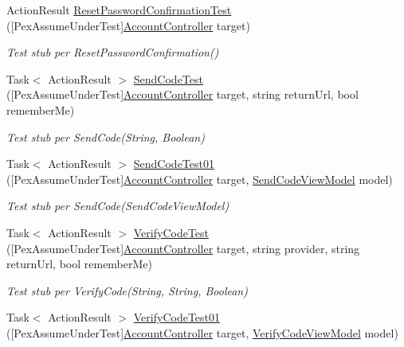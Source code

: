 \begin{DoxyCompactItemize}
Action\+Result \mbox{\hyperlink{class_brew_day2_1_1_tests_1_1_account_controller_test_a7a031ab5085a878292c47235638abee4}{Reset\+Password\+Confirmation\+Test}} (\mbox{[}Pex\+Assume\+Under\+Test\mbox{]}\mbox{\hyperlink{class_brew_day2_1_1_controllers_1_1_account_controller}{Account\+Controller}} target)
\begin{DoxyCompactList}\small\item\em Test stub per Reset\+Password\+Confirmation()\end{DoxyCompactList}\item 
Task$<$ Action\+Result $>$ \mbox{\hyperlink{class_brew_day2_1_1_tests_1_1_account_controller_test_ae3f845b68eb068d8dbd64bb207a6dcf0}{Send\+Code\+Test}} (\mbox{[}Pex\+Assume\+Under\+Test\mbox{]}\mbox{\hyperlink{class_brew_day2_1_1_controllers_1_1_account_controller}{Account\+Controller}} target, string return\+Url, bool remember\+Me)
\begin{DoxyCompactList}\small\item\em Test stub per Send\+Code(\+String, Boolean)\end{DoxyCompactList}\item 
Task$<$ Action\+Result $>$ \mbox{\hyperlink{class_brew_day2_1_1_tests_1_1_account_controller_test_a0d56fa9fe1e0c1f19ea26370bee503bb}{Send\+Code\+Test01}} (\mbox{[}Pex\+Assume\+Under\+Test\mbox{]}\mbox{\hyperlink{class_brew_day2_1_1_controllers_1_1_account_controller}{Account\+Controller}} target, \mbox{\hyperlink{class_brew_day2_1_1_models_1_1_send_code_view_model}{Send\+Code\+View\+Model}} model)
\begin{DoxyCompactList}\small\item\em Test stub per Send\+Code(\+Send\+Code\+View\+Model)\end{DoxyCompactList}\item 
Task$<$ Action\+Result $>$ \mbox{\hyperlink{class_brew_day2_1_1_tests_1_1_account_controller_test_a56bb44e29872292efb61d07e130e051a}{Verify\+Code\+Test}} (\mbox{[}Pex\+Assume\+Under\+Test\mbox{]}\mbox{\hyperlink{class_brew_day2_1_1_controllers_1_1_account_controller}{Account\+Controller}} target, string provider, string return\+Url, bool remember\+Me)
\begin{DoxyCompactList}\small\item\em Test stub per Verify\+Code(\+String, String, Boolean)\end{DoxyCompactList}\item 
Task$<$ Action\+Result $>$ \mbox{\hyperlink{class_brew_day2_1_1_tests_1_1_account_controller_test_a47948857ef4b3ee271de407ecc68e368}{Verify\+Code\+Test01}} (\mbox{[}Pex\+Assume\+Under\+Test\mbox{]}\mbox{\hyperlink{class_brew_day2_1_1_controllers_1_1_account_controller}{Account\+Controller}} target, \mbox{\hyperlink{class_brew_day2_1_1_models_1_1_verify_code_view_model}{Verify\+Code\+View\+Model}} model)

\end{DoxyCompactItemize}
